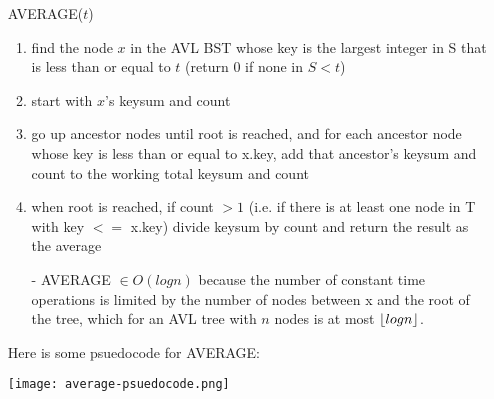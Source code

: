 \documentclass[11pt]{article}
\DeclarePairedDelimiter\floor{\lfloor}{\rfloor}
\begin{document}
\begin{itemize}
\item[] AVERAGE($t$)
 	\begin{enumerate}
	\item find the node $x$ in the AVL BST whose key is the largest integer in S that is less than or equal to $t$ (return 0 if none in $S < t$)
	\item start with $x$'s keysum and count
	\item go up ancestor nodes until root is reached, and for each ancestor node whose key is less than or equal to x.key, add that ancestor's keysum and count to the working total keysum and count
	\item	when root is reached, if count $> 1$ (i.e. if there is at least one node  in T with key $<=$ x.key) divide keysum by count and return the result as the average
	\item[-] AVERAGE $\in O(logn)$ because the number of constant time operations is limited by the number of nodes between x and the root of the tree, which for an AVL tree with $n$ nodes is at most $\floor{logn}$.
	\end{enumerate}
\item[] Here is some psuedocode for AVERAGE: \\
\begin{center}\texttt{[image: average-psuedocode.png]}\end{center}
\end{itemize}
\newpage


\end{document}
